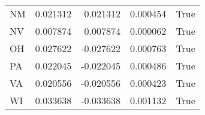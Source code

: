 \begin{table}
\begin{tabular}{lrrrl}
      NM &   0.021312 &  0.021312 &       0.000454 &          True \\
      NV &   0.007874 &  0.007874 &       0.000062 &          True \\
      OH &   0.027622 & -0.027622 &       0.000763 &          True \\
      PA &   0.022045 & -0.022045 &       0.000486 &          True \\
      VA &   0.020556 & -0.020556 &       0.000423 &          True \\
      WI &   0.033638 & -0.033638 &       0.001132 &          True \\
\bottomrule
\end{tabular}
\end{table}
